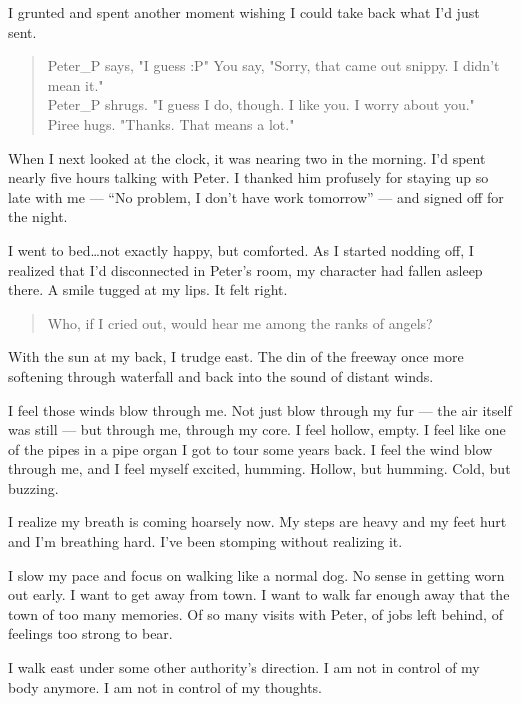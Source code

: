 I grunted and spent another moment wishing I could take back what I'd just sent.

\begin{verse}
    {\ttfamily
Peter\_P says, "I guess :P"
You say, "Sorry, that came out snippy. I didn't mean it."\\
Peter\_P shrugs. "I guess I do, though. I like you. I worry about you."\\
Piree hugs. "Thanks. That means a lot."}
\end{verse}

When I next looked at the clock, it was nearing two in the morning. I'd spent nearly five hours talking with Peter. I thanked him profusely for staying up so late with me --- ``No problem, I don't have work tomorrow'' --- and signed off for the night.

I went to bed\ldots{}not exactly happy, but comforted. As I started nodding off, I realized that I'd disconnected in Peter's room, my character had fallen asleep there. A smile tugged at my lips. It felt right.

\secdiv{}

\noindent \begin{verse}
Who, if I cried out, would hear me among the ranks of angels?
\end{verse}

With the sun at my back, I trudge east. The din of the freeway once more softening through waterfall and back into the sound of distant winds.

I feel those winds blow through me. Not just blow through my fur --- the air itself was still --- but through me, through my core. I feel hollow, empty. I feel like one of the pipes in a pipe organ I got to tour some years back. I feel the wind blow through me, and I feel myself excited, humming. Hollow, but humming. Cold, but buzzing.

I realize my breath is coming hoarsely now. My steps are heavy and my feet hurt and I'm breathing hard. I've been stomping without realizing it.

I slow my pace and focus on walking like a normal dog. No sense in getting worn out early. I want to get away from town. I want to walk far enough away that the town of too many memories. Of so many visits with Peter, of jobs left behind, of feelings too strong to bear.

I walk east under some other authority's direction. I am not in control of my body anymore. I am not in control of my thoughts.

